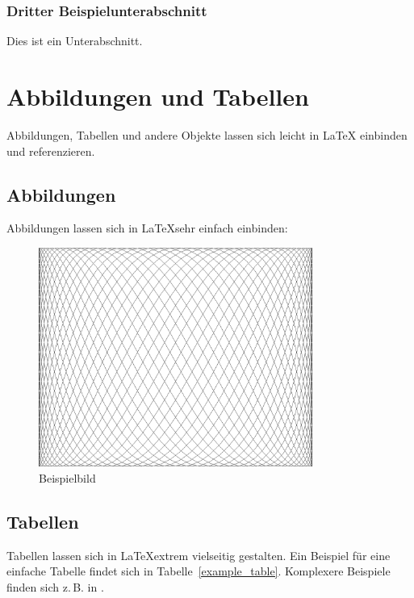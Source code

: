\documentclass[12pt,oneside,a4paper,bibtotoc,liststotoc]{scrreprt}
\newcommand{\zB}{\mbox{z.\,B.}\xspace}
\begin{document}
\subsection{Dritter Beispielunterabschnitt}
\label{dritter_beispielunterabschnitt}

Dies ist ein Unterabschnitt.

\chapter{Abbildungen und Tabellen}

Abbildungen, Tabellen und andere Objekte lassen sich leicht in \LaTeX
einbinden und referenzieren.

\section{Abbildungen}

Abbildungen lassen sich in \LaTeX sehr einfach einbinden:

\begin{figure}[H]
  \begin{centering}
    \includegraphics[width=0.8\textwidth]{img/example.png}
    \caption{Beispielbild}
    \label{example_image}
  \end{centering}
\end{figure}

\section{Tabellen}

Tabellen lassen sich in \LaTeX extrem vielseitig gestalten. Ein
Beispiel für eine einfache Tabelle findet sich in
Tabelle~\ref{example_table}. Komplexere Beispiele finden sich \zB in
\cite[][]{WikibookTables}.
\end{document}
